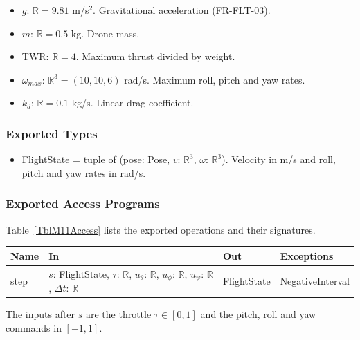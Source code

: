 \documentclass[12pt, titlepage]{article}
\begin{document}
\begin{itemize}
\item $g$: $\mathbb{R} = 9.81$ m/s$^2$. Gravitational acceleration
  (FR-FLT-03).
\item $m$: $\mathbb{R} = 0.5$ kg. Drone mass.
\item TWR: $\mathbb{R} = 4$. Maximum thrust divided by weight.
\item $\omega_{max}$: $\mathbb{R}^3 = (10, 10, 6)$ rad/s. Maximum roll, pitch
  and yaw rates.
\item $k_d$: $\mathbb{R} = 0.1$ kg/s. Linear drag coefficient.
\end{itemize}

\subsubsection{Exported Types}

\begin{itemize}
\item FlightState = tuple of (pose: Pose, $v$: $\mathbb{R}^3$, $\omega$:
  $\mathbb{R}^3$). Velocity in m/s and roll, pitch and yaw rates in rad/s.
\end{itemize}

\subsubsection{Exported Access Programs}

Table~\ref{TblM11Access} lists the exported operations and their signatures.

\begin{center}
\begin{minipage}{\textwidth}
\begin{tabularx}{\textwidth}{p{1.6cm} >{\raggedright\arraybackslash}X p{2.4cm}
p{3.2cm}}
\toprule
\textbf{Name} & \textbf{In} & \textbf{Out} & \textbf{Exceptions} \\
\midrule
step & $s$: FlightState, $\tau$: $\mathbb{R}$, $u_\theta$: $\mathbb{R}$,
$u_\phi$: $\mathbb{R}$, $u_\psi$: $\mathbb{R}$, $\Delta t$: $\mathbb{R}$ &
FlightState & NegativeInterval \\
\bottomrule
\end{tabularx}
\label{TblM11Access}
\end{minipage}
\end{center}

The inputs after $s$ are the throttle $\tau \in [0, 1]$ and the pitch, roll and
yaw commands in $[-1, 1]$.
\end{document}
